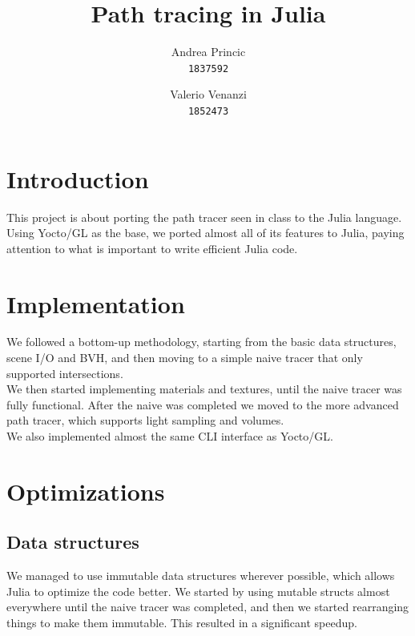 \documentclass[12pt]{report}
\title{Path tracing in Julia}
\author{
    Andrea Princic\\
    \texttt{1837592}
    \and
    Valerio Venanzi\\
    \texttt{1852473}
}
\begin{document}
    \maketitle



    \section*{Introduction}\label{sec:introduction}
    This project is about porting the path tracer seen in class to the Julia language.
    Using Yocto/GL as the base, we ported almost all of its features to Julia,
    paying attention to what is important to write efficient Julia code.


    \section*{Implementation}\label{sec:implementation}
    We followed a bottom-up methodology, starting from the basic data structures, scene I/O and BVH,
    and then moving to a simple naive tracer that only supported intersections.\\
    We then started implementing materials and textures, until the naive tracer was fully functional.
    After the naive was completed we moved to the more advanced path tracer, which supports light sampling and volumes.\\
    We also implemented almost the same CLI interface as Yocto/GL\@.


    \section*{Optimizations}\label{sec:optimizations}
    \subsection*{Data structures}\label{subsec:optimizations-data-structures}
    We managed to use immutable data structures wherever possible, which allows Julia to optimize the code better.
    We started by using mutable structs almost everywhere until the naive tracer was completed, and then we started
    rearranging things to make them immutable.
    This resulted in a significant speedup.
\end{document}
